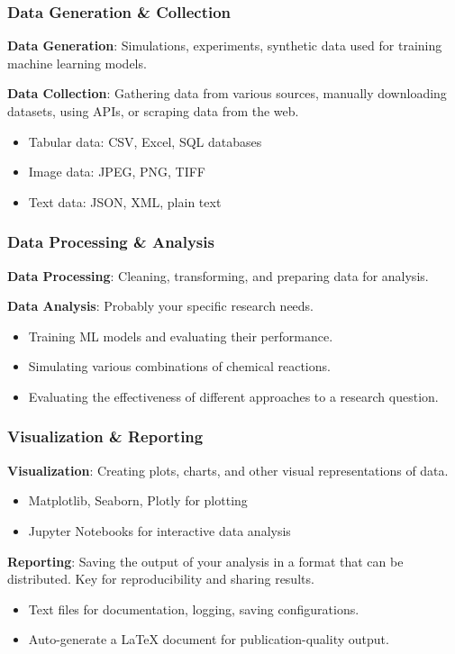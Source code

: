 \documentclass{beamer}
\begin{document}
\begin{frame}
    \frametitle{Data Generation \& Collection}
    \textbf{Data Generation}: Simulations, experiments, synthetic data used for training machine learning models.

    \textbf{Data Collection}: Gathering data from various sources, manually downloading datasets, using APIs, or scraping data from the web.

    \begin{itemize}
        \item Tabular data: CSV, Excel, SQL databases
        \item Image data: JPEG, PNG, TIFF
        \item Text data: JSON, XML, plain text
    \end{itemize}
\end{frame}

\begin{frame}
    \frametitle{Data Processing \& Analysis}
    \textbf{Data Processing}: Cleaning, transforming, and preparing data for analysis.

    \textbf{Data Analysis}: Probably your specific research needs.

    \begin{itemize}
        \item Training ML models and evaluating their performance.
        \item Simulating various combinations of chemical reactions.
        \item Evaluating the effectiveness of different approaches to a research question.
    \end{itemize}
\end{frame}

\begin{frame}
    \frametitle{Visualization \& Reporting}
    \textbf{Visualization}: Creating plots, charts, and other visual representations of data.

    \begin{itemize}
        \item Matplotlib, Seaborn, Plotly for plotting
        \item Jupyter Notebooks for interactive data analysis
    \end{itemize}

    \textbf{Reporting}: Saving the output of your analysis in a format that can be distributed.
    Key for reproducibility and sharing results.

    \begin{itemize}
        \item Text files for documentation, logging, saving configurations.
        \item Auto-generate a \LaTeX{} document for publication-quality output.
    \end{itemize}
\end{frame}
\end{document}
